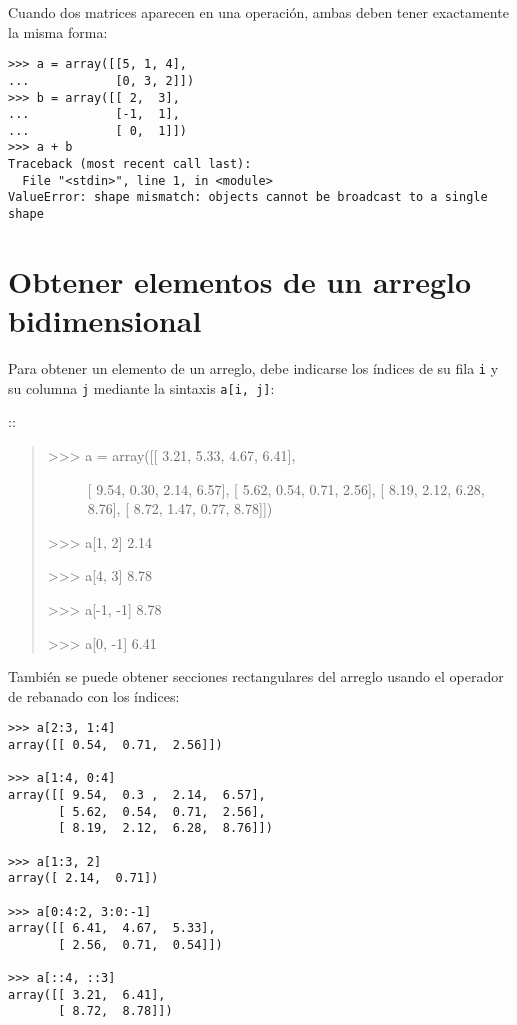 Cuando dos matrices aparecen en una operación, ambas deben tener
exactamente la misma forma:

\begin{lstlisting}
>>> a = array([[5, 1, 4],
...            [0, 3, 2]])
>>> b = array([[ 2,  3],
...            [-1,  1],
...            [ 0,  1]])
>>> a + b
Traceback (most recent call last):
  File "<stdin>", line 1, in <module>
ValueError: shape mismatch: objects cannot be broadcast to a single shape
\end{lstlisting}

\section{Obtener elementos de un arreglo bidimensional}

Para obtener un elemento de un arreglo, debe indicarse los índices de su
fila \lstinline!i! y su columna \lstinline!j! mediante la sintaxis
\lstinline!a[i, j]!:

::

\begin{quote}
\begin{description}
\item[\textgreater{}\textgreater{}\textgreater{} a = array({[}{[} 3.21,
5.33, 4.67, 6.41{]},]
{[} 9.54, 0.30, 2.14, 6.57{]}, {[} 5.62, 0.54, 0.71, 2.56{]}, {[} 8.19,
2.12, 6.28, 8.76{]}, {[} 8.72, 1.47, 0.77, 8.78{]}{]})
\end{description}

\textgreater{}\textgreater{}\textgreater{} a{[}1, 2{]} 2.14

\textgreater{}\textgreater{}\textgreater{} a{[}4, 3{]} 8.78

\textgreater{}\textgreater{}\textgreater{} a{[}-1, -1{]} 8.78

\textgreater{}\textgreater{}\textgreater{} a{[}0, -1{]} 6.41
\end{quote}

También se puede obtener secciones rectangulares del arreglo usando el
operador de rebanado con los índices:

\begin{lstlisting}
>>> a[2:3, 1:4]
array([[ 0.54,  0.71,  2.56]])

>>> a[1:4, 0:4]
array([[ 9.54,  0.3 ,  2.14,  6.57],
       [ 5.62,  0.54,  0.71,  2.56],
       [ 8.19,  2.12,  6.28,  8.76]])

>>> a[1:3, 2]
array([ 2.14,  0.71])

>>> a[0:4:2, 3:0:-1]
array([[ 6.41,  4.67,  5.33],
       [ 2.56,  0.71,  0.54]])

>>> a[::4, ::3]
array([[ 3.21,  6.41],
       [ 8.72,  8.78]])
\end{lstlisting}

